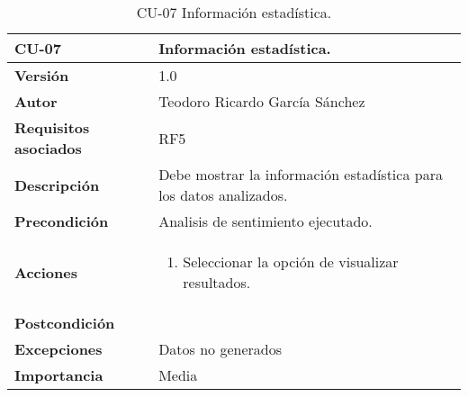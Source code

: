 \begin{table}[p]
	\centering
	\begin{tabularx}{\linewidth}{ p{} p{} }
		\toprule
		\textbf{CU-07}    & \textbf{Información estadística.}\\
		\toprule
		\textbf{Versión}              & 1.0    \\
		\textbf{Autor}                & Teodoro Ricardo García Sánchez \\
		\textbf{Requisitos asociados} & RF5 \\
		\textbf{Descripción}          & Debe mostrar la información estadística para los datos analizados.  \\
		\textbf{Precondición}         & Analisis de sentimiento ejecutado. \\
		\textbf{Acciones}             &
		\begin{enumerate}
			\def\labelenumi{\arabic{enumi}.}
			\tightlist
			\item Seleccionar la opción de visualizar resultados.
		\end{enumerate}\\
		\textbf{Postcondición}        &  \\
		\textbf{Excepciones}          & Datos no generados \\
		\textbf{Importancia}          & Media \\
		\bottomrule
	\end{tabularx}
	\caption{CU-07 Información estadística.}
\end{table}


